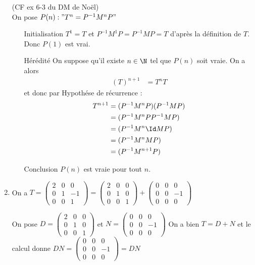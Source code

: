 \documentclass[a4paper, 11pt,reqno]{article}
\begin{document}
\begin{correction}
\begin{enumerate}
(CF ex 6-3 du DM de Noël) \\

On pose $P(n) : "T^n =P^{-1} M^n P"$
\begin{itemize}
\item[Initialisation] 
$T^1 =T$ et $P^{-1} M^1 P= P^{-1} M P=T$ d'après la définition de $T$.
Donc $P(1) $ est vrai. 

\item[Hérédité] On suppose qu'il existe $n\in \N$ tel que $P(n)$ soit vraie. 
On a alors 
\begin{align*}
 (T)^{n+1}&=  T^n  T
\end{align*}
et donc par Hypothése de récurrence : 
\begin{align*}
 T^{n+1}&=  (P^{-1}M^n P )  (P^{-1}M P )\\
 							&=  (P^{-1}M^n P  P^{-1}M P )\\
 							&=  (P^{-1}M^n \Id M P )\\
 							&=  (P^{-1}M^n M P )\\
 							&=  (P^{-1}M^{n+1} P )
\end{align*}
\item[Conclusion] $P(n)$ est vraie pour tout $n$. 




\end{itemize}
\item On a 
$T= \left(\begin{array}{ccc}  
2&0&0 \\
0 &1&-1 \\
0&0&1 
\end{array}\right)  = \left(\begin{array}{ccc}  
2&0&0 \\
 0&1&0 \\
0&0&1 
\end{array}\right) + \left(\begin{array}{ccc}  
0&0&0 \\
0 &0&-1 \\
0&0&0 
\end{array}\right)  $  

On pose $D= \left(\begin{array}{ccc}  
2&0&0 \\
 0&1&0 \\
0&0&1 
\end{array}\right) $ et $N= \left(\begin{array}{ccc}  
0&0&0 \\
 0&0&-1 \\
0&0&0 
\end{array}\right)  $ 
On a bien $T =D+N$ et  le calcul donne 
$DN = \left(\begin{array}{ccc}  
0&0&0 \\
0 &0&-1 \\
0&0&0 
\end{array}\right) =DN $ 



\end{enumerate}
\end{correction}
\end{document}
